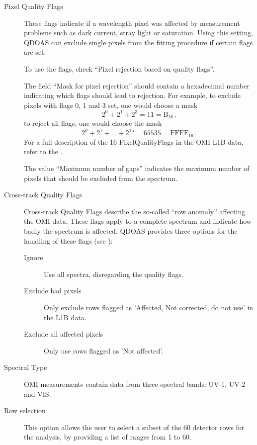 \begin{description}
\item[Pixel Quality Flags] These flags indicate if a wavelength pixel
  was affected by measurement problems such as dark current, stray
  light or saturation.  Using this setting, QDOAS can exclude single
  pixels from the fitting procedure if certain flags are set.

  To use the flags, check ``Pixel rejection based on quality flags''.

  The field ``Mask for pixel rejection'' should contain a hexadecimal
  number indicating which flags should lead to rejection.  For
  example, to exclude pixels with flags 0, 1 and 3 set, one would
  choose a mask
  \begin{equation*}
    2^0 + 2^1 + 2^3 = 11 = \mathrm{B}_{16}\,.
  \end{equation*}
  to reject all flags, one would choose the mask
  \begin{equation*}
    2^0 + 2^1 + \ldots + 2^{15} = 65535 = \mathrm{FFFF}_{16}
    \,.
  \end{equation*}
  For a full description of the 16 PixelQualityFlags in the OMI L1B data,
  refer to the \citet{OMI_iods}.

  The value ``Maximum number of gaps'' indicates the maximum number of
  pixels that should be excluded from the spectrum.
\item[Cross-track Quality Flags] Cross-track Quality Flags describe
  the so-called ``row anomaly'' affecting the OMI data.  These flags
  apply to a complete spectrum and indicate how badly the spectrum is
  affected.  QDOAS provides three options for the handling of these
  flags (see \citep{OMI_iods}):
  \begin{description}
    \item[Ignore] Use all spectra, disregarding the quality flags.
    \item[Exclude bad pixels] Only exclude rows flagged as 'Affected,
      Not corrected, do not use' in the L1B data.
    \item[Exclude all affected pixels] Only use rows flagged as 'Not
      affected'.
  \end{description}
\item[Spectral Type] OMI measurements contain data from three spectral
  bands: UV-1, UV-2 and VIS.
\item[Row selection] This option allows the user to select a subset of
  the 60 detector rows for the analysis, by providing a list of ranges
  from 1 to 60.
\end{description}

